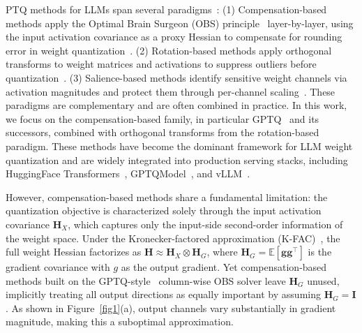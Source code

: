 \documentclass{article} %
\begin{document}
PTQ methods for LLMs span several  paradigms~\citep{zhao2025benchmarking}: (1) Compensation-based methods apply the Optimal Brain Surgeon (OBS) principle~\citep{hassibi1992second, lecun1989optimal} layer-by-layer, using the input activation covariance as a proxy Hessian to compensate for rounding error in weight quantization~\citep{frantar2022optimal, frantar2022gptq,kim2024boa,li2025gptaq, tseng2025model, kim2025guidedquant}. (2) Rotation-based methods apply orthogonal transforms to weight matrices and activations to suppress outliers before quantization~\citep{chee2023quip,tseng2024quip,ashkboos2024quarot,liu2024spinquant}. (3) Salience-based methods identify sensitive weight channels via activation magnitudes and protect them through per-channel scaling~\citep{lin2024awq,xiao2023smoothquant}. These paradigms are 
complementary and are often combined in practice.
In this work, we focus on the compensation-based family, in particular GPTQ~\citep{frantar2022gptq} and its successors, combined with orthogonal transforms from the rotation-based paradigm. These methods have become the dominant framework for LLM weight quantization and are widely integrated into production serving stacks, including HuggingFace Transformers~\citep{wolf-etal-2020-transformers}, GPTQModel~\citep{qubitium2024gptqmodel}, and vLLM~\citep{kwon2023efficient}.

However, compensation-based methods share a fundamental limitation: the quantization objective is characterized solely through the input activation covariance $\mathbf{H}_X$, which captures only the input-side second-order information of the weight space. Under the Kronecker-factored approximation (K-FAC)~\citep{martens2015optimizing}, the full weight Hessian factorizes as $\mathbf{H} \approx \mathbf{H}_X \otimes \mathbf{H}_G$, where $\mathbf{H}_G = \mathbb{E}[\mathbf{gg}^\top]$ is the gradient covariance with $g$ as the output gradient. Yet compensation-based methods built on the GPTQ-style~\citep{frantar2022gptq} column-wise OBS solver leave $\mathbf{H}_G$ unused, implicitly treating all output directions as equally important by assuming $\mathbf{H}_G = \mathbf{I}$. As shown in Figure~\ref{fig1}(a), output channels vary substantially in gradient magnitude, making this a suboptimal approximation.

\end{document}

